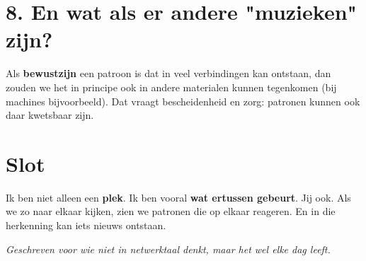 \documentclass[12pt,a4paper]{article}
\begin{document}
\section*{8. En wat als er andere "muzieken" zijn?}
Als \textbf{bewustzijn} een patroon is dat in veel verbindingen kan ontstaan, dan zouden we het in principe ook in andere materialen kunnen tegenkomen (bij machines bijvoorbeeld). Dat vraagt bescheidenheid en zorg: patronen kunnen ook daar kwetsbaar zijn.

\section*{Slot}
Ik ben niet alleen een \textbf{plek}. Ik ben vooral \textbf{wat ertussen gebeurt}. Jij ook. Als we zo naar elkaar kijken, zien we patronen die op elkaar reageren. En in die herkenning kan iets nieuws ontstaan.

\vspace{1em}
\begin{center}
\textit{Geschreven voor wie niet in netwerktaal denkt, maar het wel elke dag leeft.}
\end{center}
\end{document}
